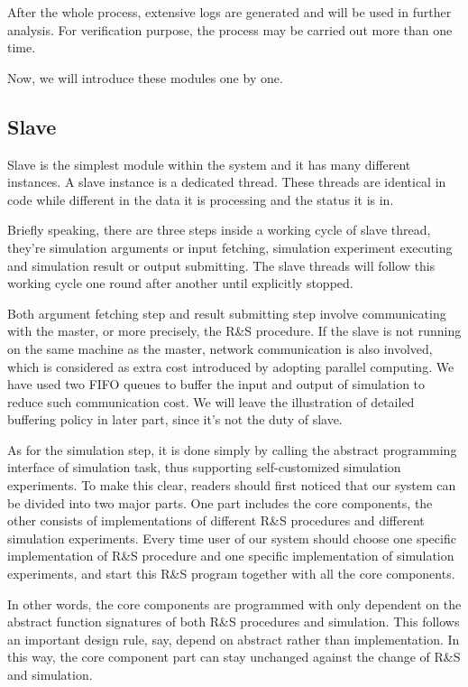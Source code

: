 After the whole process, extensive logs are generated and will be used in further analysis. For verification purpose, the process may be carried out more than one time.

Now, we will introduce these modules one by one.

\subsection{Slave}

Slave is the simplest module within the system and it has many different instances. A slave instance is a dedicated thread. These threads are identical in code while different in the data it is processing and the status it is in.

Briefly speaking, there are three steps inside a working cycle of slave thread, they're simulation arguments or input fetching, simulation experiment executing and simulation result or output submitting. The slave threads will follow this working cycle one round after another until explicitly stopped.

Both argument fetching step and result submitting step involve communicating with the master, or more precisely, the R\&S procedure. If the slave is not running on the same machine as the master, network communication is also involved, which is considered as extra cost introduced by adopting parallel computing. We have used two FIFO queues to buffer the input and output of simulation to reduce such communication cost. We will leave the illustration of detailed buffering policy in later part, since it's not the duty of slave.

As for the simulation step, it is done simply by calling the abstract programming interface of simulation task, thus supporting self-customized simulation experiments. To make this clear, readers should first noticed that our system can be divided into two major parts. One part includes the core components, the other consists of implementations of different R\&S procedures and different simulation experiments. Every time user of our system should choose one specific implementation of R\&S procedure and one specific implementation of simulation experiments, and start this R\&S program together with all the core components.

In other words, the core components are programmed with only dependent on the abstract function signatures of both R\&S procedures and simulation. This follows an important design rule, say, depend on abstract rather than implementation. In this way, the core component part can stay unchanged against the change of R\&S and simulation.

